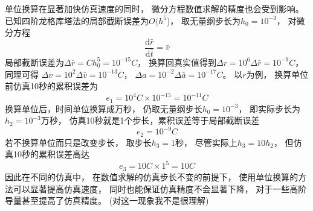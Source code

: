 单位换算在显著加快仿真速度的同时，
微分方程数值求解的精度也会受到影响。
已知四阶龙格库塔法的局部截断误差为$O(h^5$)\cite{mqingyang2019}，
取无量纲步长为$h_0=10^{-3}$，
对微分方程
\[\frac{\text{d}\bar{r}}{\text{d}\bar{t}}=\bar{v}\]
局部截断误差为$\Delta\bar{r}=Ch_0^5=10^{-15}C$，
换算回真实值得到$\Delta r=10^6\Delta\bar{r}=10^{-9}C$，
同理可得
$\Delta v=10^2\Delta\bar{v}=10^{-13}C$，
$\Delta a=10^{-2}\Delta\bar{a}=10^{-17}C$。
以$r$为例，
换算单位前仿真10秒的累积误差为
\[e_1=10^4C\times 10^{-15}=10^{-11}C\]
换算单位后，时间单位换算成万秒，
仍取无量纲步长$h_0=10^{-3}$，
即实际步长为$h_2=10^{-3}$万秒，
仿真10秒就是1个步长，累积误差等于局部截断误差
\[e_2=10^{-9}C\]
若不换算单位而只是改变步长，
取步长$h_3=1$秒，
尽管实际上$h_3=10h_2$，
但仿真10秒的累积误差高达
\[e_3=10C\times 1^5=10C\]
因此在不同的仿真中，
在数值求解的仿真步长不变的前提下，
使用单位换算的方法可以显著提高仿真速度，
同时也能保证仿真精度不会显著下降，
对于一些高阶导量甚至提高了仿真精度。
(对这一现象我不是很理解)

